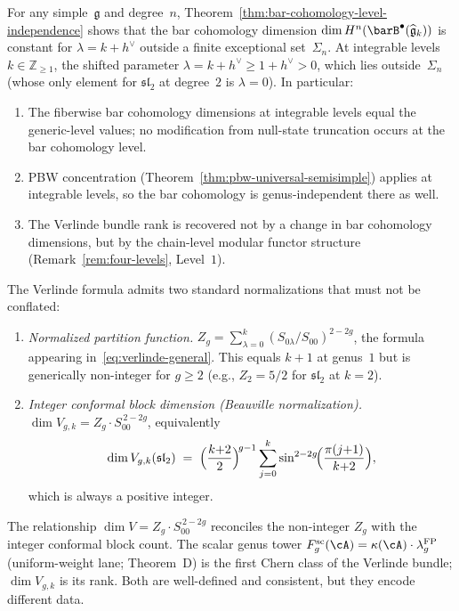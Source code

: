 \begin{proposition}%
\label{prop:integrable-level-independence}%
%
%
For any simple~$\mathfrak{g}$ and degree~$n$,
Theorem~\textup{\ref{thm:bar-cohomology-level-independence}} shows that
the bar cohomology dimension $\dim H^n(\barB^\bullet(\widehat{\mathfrak{g}}_k))$
is constant for $\lambda = k + h^\vee$ outside a finite exceptional set~$\Sigma_n$.
At integrable levels $k \in \mathbb{Z}_{\ge 1}$, the shifted parameter
$\lambda = k + h^\vee \ge 1 + h^\vee > 0$, which lies outside~$\Sigma_n$
(whose only element for $\mathfrak{sl}_2$ at degree~$2$ is $\lambda = 0$).
In particular:
\begin{enumerate}[label=\textup{(\roman*)}]
\item The fiberwise bar cohomology dimensions at integrable levels
 equal the generic-level values; no modification from null-state
 truncation occurs at the bar cohomology level.
\item PBW concentration (Theorem~\textup{\ref{thm:pbw-universal-semisimple}})
 applies at integrable levels, so the bar cohomology is
 genus-independent there as well.
\item The Verlinde bundle rank is recovered not by a change in bar
 cohomology dimensions, but by the chain-level modular functor
 structure (Remark~\textup{\ref{rem:four-levels}}, Level~$1$).
\end{enumerate}
\end{proposition}

\begin{remark}%
\label{rem:two-verlinde-normalizations}%
%
The Verlinde formula admits two standard normalizations
that must not be conflated:
\begin{enumerate}[label=\textup{(\alph*)}]
\item \emph{Normalized partition function.}
 $Z_g = \sum_{\lambda=0}^{k} (S_{0\lambda}/S_{00})^{2-2g}$,
 the formula appearing in~\eqref{eq:verlinde-general}.
 This equals $k{+}1$ at genus~$1$ but is generically
 non-integer for $g \ge 2$ (e.g., $Z_2 = 5/2$ for
 $\mathfrak{sl}_2$ at $k = 2$).
\item \emph{Integer conformal block dimension
 \textup{(}Beauville normalization\textup{)}.}
 $\dim V_{g,k} = Z_g \cdot S_{00}^{\,2-2g}$,
 equivalently
 \[
 \dim V_{g,k}(\mathfrak{sl}_2)
 \;=\; \Bigl(\frac{k{+}2}{2}\Bigr)^{\!g-1}
 \sum_{j=0}^{k}
 \sin^{2-2g}\!\Bigl(\frac{\pi(j{+}1)}{k{+}2}\Bigr),
 \]
 which is always a positive integer.
\end{enumerate}
The relationship $\dim V = Z_g \cdot S_{00}^{\,2-2g}$
reconciles the non-integer $Z_g$ with the integer
conformal block count.
The scalar genus tower
$F_g^{\mathrm{sc}}(\cA) = \kappa(\cA) \cdot \lambda_g^{\mathrm{FP}}$
\textup{(}uniform-weight lane; Theorem~D\textup{)}
is the first Chern class of the Verlinde bundle;
$\dim V_{g,k}$ is its rank. Both are well-defined and consistent,
but they encode different data.
\end{remark}

